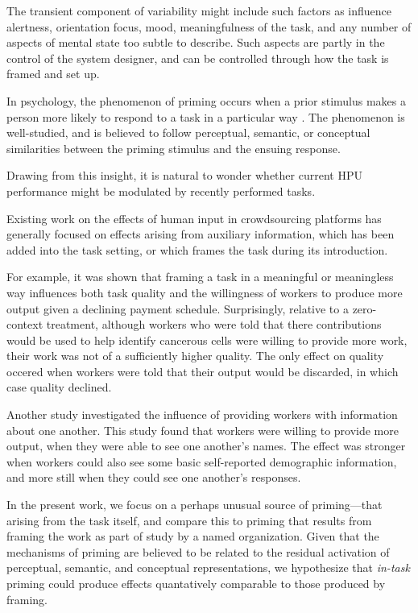 \documentclass[letterpaper]{article}
\begin{document}
The transient component of variability might include such factors as influence
alertness, orientation focus, mood, meaningfulness of the task, and any number
of aspects of mental state too subtle to describe.  Such aspects are partly
in the control of the system designer, and can be controlled through how the
task is framed and set up.

In psychology, the phenomenon of priming occurs when a prior stimulus 
makes a person more likely to respond to a task in a particular way
\cite{schvaneveldt1973retrieval, No2007}.  The 
phenomenon is well-studied, and is believed to follow perceptual, semantic,
or conceptual similarities between the priming stimulus and the ensuing 
response.

Drawing from this insight, it is natural to wonder whether current HPU 
performance might be modulated by recently performed tasks.

Existing work on the effects of human input in crowdsourcing platforms has
generally focused on effects arising from auxiliary information, which has
been added into the task setting, or which frames the task during its 
introduction.  

For example, it was shown that framing a task in a meaningful or meaningless
way influences both task quality and the willingness of workers to produce
more output given a declining payment schedule.
Surprisingly, relative to a zero-context treatment, although workers who were
told that there contributions would be used to help identify cancerous cells
were willing to provide more work, their work was not of a sufficiently higher
quality.  The only effect on quality occered when workers were told that their
output would be discarded, in which case quality declined.

Another study investigated the influence of providing workers with information
about one another.  This study found that workers were willing to provide
more output, when they were able to see one another's names.  The effect was 
stronger when workers could also see some basic self-reported demographic 
information, and more still when they could see one another's responses.

In the present work, we focus on a perhaps unusual source of priming---that 
arising from the task itself, and compare this to priming that results from 
framing the work as part of study by a named organization.  Given that the 
mechanisms of priming are believed to be related to the residual activation of
perceptual, semantic, and conceptual representations, we hypothesize that 
\textit{in-task} priming could produce effects quantatively comparable to those
produced by framing.
\end{document}
